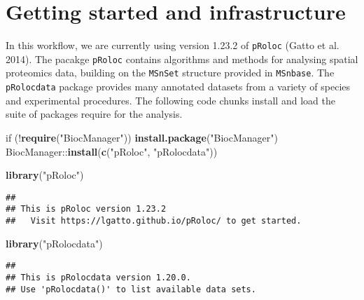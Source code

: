 \documentclass[]{article}
\newenvironment{Shaded}{\begin{snugshade}}{\end{snugshade}}
\newcommand{\KeywordTok}[1]{\textcolor[rgb]{0.13,0.29,0.53}{\textbf{{#1}}}}
\newcommand{\StringTok}[1]{\textcolor[rgb]{0.31,0.60,0.02}{{#1}}}
\newcommand{\NormalTok}[1]{{#1}}
\begin{document}
\section{Getting started and
infrastructure}\label{getting-started-and-infrastructure}

In this workflow, we are currently using version 1.23.2 of
\texttt{pRoloc} (Gatto et al. 2014). The pacakge \texttt{pRoloc}
contains algorithms and methods for analysing spatial proteomics data,
building on the \texttt{MSnSet} structure provided in \texttt{MSnbase}.
The \texttt{pRolocdata} package provides many annotated datasets from a
variety of species and experimental procedures. The following code
chunks install and load the suite of packages require for the analysis.

\begin{Shaded}
\begin{Highlighting}[]
\NormalTok{if (!}\KeywordTok{require}\NormalTok{(}\StringTok{"BiocManager"}\NormalTok{))}
    \KeywordTok{install.package}\NormalTok{(}\StringTok{"BiocManager"}\NormalTok{)}
\NormalTok{BiocManager::}\KeywordTok{install}\NormalTok{(}\KeywordTok{c}\NormalTok{(}\StringTok{"pRoloc"}\NormalTok{, }\StringTok{"pRolocdata"}\NormalTok{))}
\end{Highlighting}
\end{Shaded}

\begin{Shaded}
\begin{Highlighting}[]
\KeywordTok{library}\NormalTok{(}\StringTok{"pRoloc"}\NormalTok{)}
\end{Highlighting}
\end{Shaded}

\begin{verbatim}
## 
## This is pRoloc version 1.23.2 
##   Visit https://lgatto.github.io/pRoloc/ to get started.
\end{verbatim}

\begin{Shaded}
\begin{Highlighting}[]
\KeywordTok{library}\NormalTok{(}\StringTok{"pRolocdata"}\NormalTok{)}
\end{Highlighting}
\end{Shaded}

\begin{verbatim}
## 
## This is pRolocdata version 1.20.0.
## Use 'pRolocdata()' to list available data sets.
\end{verbatim}
\end{document}
